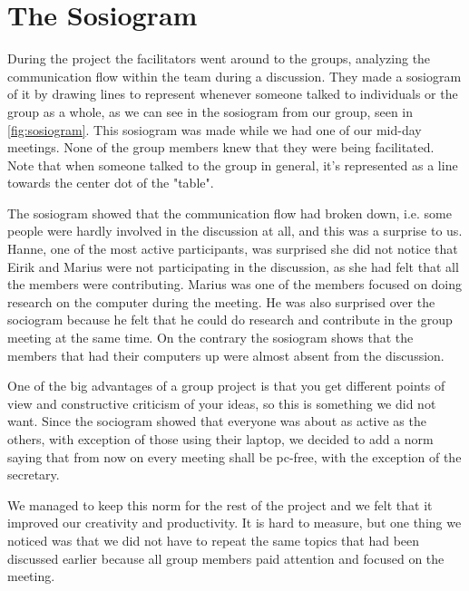 \section{The Sosiogram}
During the project the facilitators went around to the groups, analyzing the communication flow within the team during a discussion. They made a sosiogram of it by drawing lines to represent whenever someone talked to individuals or the group as a whole, as we can see in the sosiogram from our group, seen in \autoref{fig:sosiogram}. This sosiogram was made while we had one of our mid-day meetings. None of the group members knew that they were being facilitated. Note that when someone talked to the group in general, it's represented as a line towards the center dot of the "table".

The sosiogram showed that the communication flow had broken down, i.e. some people were hardly involved in the discussion at all, and this was a surprise to us. Hanne, one of the most active participants, was surprised she did not notice that Eirik and Marius were not participating in the discussion, as she had felt that all the members were contributing. Marius was one of the members focused on doing research on the computer during the meeting. He was also surprised over the sociogram because he felt that he could do research and contribute in the group meeting at the same time. On the contrary the sosiogram shows that the members that had their computers up were almost absent from the discussion.

One of the big advantages of a group project is that you get different points of view and constructive criticism of your ideas, so this is something we did not want. Since the sociogram showed that everyone was about as active as the others, with exception of those using their laptop, we decided to add a norm saying that from now on every meeting shall be pc-free, with the exception of the secretary. 

We managed to keep this norm for the rest of the project and we felt that it improved our creativity and productivity. It is hard to measure, but one thing we noticed was that we did not have to repeat the same topics that had been discussed earlier because all group members paid attention and focused on the meeting. 



